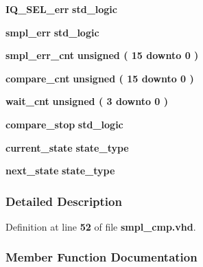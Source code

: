 \begin{DoxyCompactItemize}
\item 
{\bf I\+Q\+\_\+\+S\+E\+L\+\_\+err} {\bfseries \textcolor{comment}{std\+\_\+logic}\textcolor{vhdlchar}{ }} 
\item 
{\bf smpl\+\_\+err} {\bfseries \textcolor{comment}{std\+\_\+logic}\textcolor{vhdlchar}{ }} 
\item 
{\bf smpl\+\_\+err\+\_\+cnt} {\bfseries \textcolor{comment}{unsigned}\textcolor{vhdlchar}{ }\textcolor{vhdlchar}{(}\textcolor{vhdlchar}{ }\textcolor{vhdlchar}{ } \textcolor{vhdldigit}{15} \textcolor{vhdlchar}{ }\textcolor{keywordflow}{downto}\textcolor{vhdlchar}{ }\textcolor{vhdlchar}{ } \textcolor{vhdldigit}{0} \textcolor{vhdlchar}{ }\textcolor{vhdlchar}{)}\textcolor{vhdlchar}{ }} 
\item 
{\bf compare\+\_\+cnt} {\bfseries \textcolor{comment}{unsigned}\textcolor{vhdlchar}{ }\textcolor{vhdlchar}{(}\textcolor{vhdlchar}{ }\textcolor{vhdlchar}{ } \textcolor{vhdldigit}{15} \textcolor{vhdlchar}{ }\textcolor{keywordflow}{downto}\textcolor{vhdlchar}{ }\textcolor{vhdlchar}{ } \textcolor{vhdldigit}{0} \textcolor{vhdlchar}{ }\textcolor{vhdlchar}{)}\textcolor{vhdlchar}{ }} 
\item 
{\bf wait\+\_\+cnt} {\bfseries \textcolor{comment}{unsigned}\textcolor{vhdlchar}{ }\textcolor{vhdlchar}{(}\textcolor{vhdlchar}{ }\textcolor{vhdlchar}{ } \textcolor{vhdldigit}{3} \textcolor{vhdlchar}{ }\textcolor{keywordflow}{downto}\textcolor{vhdlchar}{ }\textcolor{vhdlchar}{ } \textcolor{vhdldigit}{0} \textcolor{vhdlchar}{ }\textcolor{vhdlchar}{)}\textcolor{vhdlchar}{ }} 
\item 
{\bf compare\+\_\+stop} {\bfseries \textcolor{comment}{std\+\_\+logic}\textcolor{vhdlchar}{ }} 
\item 
{\bf current\+\_\+state} {\bfseries {\bfseries {\bf state\+\_\+type}} \textcolor{vhdlchar}{ }} 
\item 
{\bf next\+\_\+state} {\bfseries {\bfseries {\bf state\+\_\+type}} \textcolor{vhdlchar}{ }} 
\end{DoxyCompactItemize}


\subsubsection{Detailed Description}


Definition at line {\bf 52} of file {\bf smpl\+\_\+cmp.\+vhd}.



\subsubsection{Member Function Documentation}
